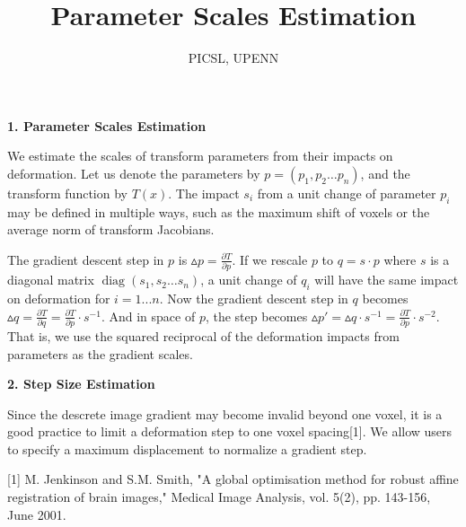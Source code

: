 \documentclass{letter}
\newcommand{\subsection}[1]{\medskip\bigskip

\noindent\textbf{\Large #1}}
\newcommand{\tmop}[1]{\ensuremath{\operatorname{#1}}}
\begin{document}
\title{Parameter Scales Estimation}\author{PICSL, UPENN}\maketitle

\subsection{1. Parameter Scales Estimation}

We estimate the scales of transform parameters from their impacts on
deformation. Let us denote the parameters by $p = (p_1, p_2 \ldots p_n)$, and
the transform function by $T (x)$. The impact $s_i$ from a unit change of
parameter $p_i$ may be defined in multiple ways, such as the maximum shift of
voxels or the average norm of transform Jacobians.

The gradient descent step in $p$ is $\vartriangle p = \frac{\partial
T}{\partial p}$. If we rescale $p$ to $q = s \cdot p$ where $s$ is a diagonal
matrix $\tmop{diag} (s_1, s_2 \ldots s_n)$, a unit change of $q_i$ will have
the same impact on deformation for $i = 1... n$. Now the gradient descent step
in $q$ becomes $\vartriangle q = \frac{\partial T}{\partial q} =
\frac{\partial T}{\partial p} \cdot s^{- 1}$. And in space of $p$, the step
becomes $\vartriangle p' = \vartriangle q \cdot s^{- 1} = \frac{\partial
T}{\partial p} \cdot s^{- 2}$. That is, we use the squared reciprocal of the
deformation impacts from parameters as the gradient scales.

\subsection{2. Step Size Estimation}

Since the descrete image gradient may become invalid beyond one voxel, it is a
good practice to limit a deformation step to one voxel spacing[1]. We allow
users to specify a maximum displacement to normalize a gradient step.



[1] M. Jenkinson and S.M. Smith, "A global optimisation method for robust
affine registration of brain images," Medical Image Analysis, vol. 5(2), pp.
143-156, June 2001.
\end{document}
